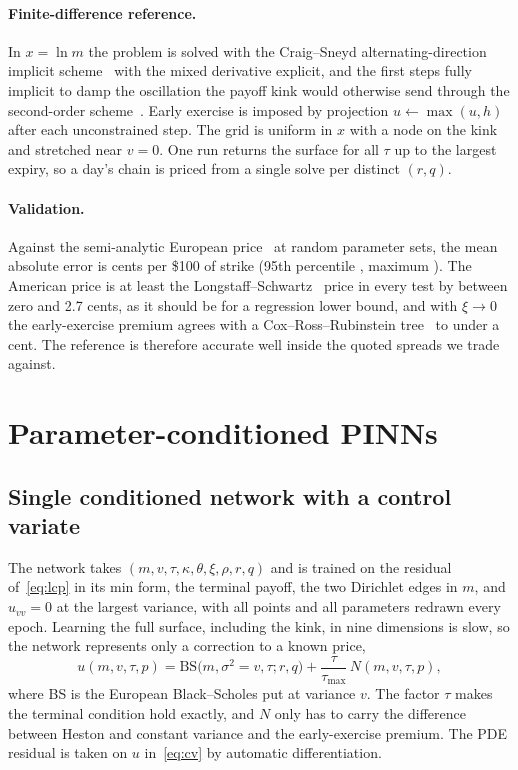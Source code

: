 \documentclass[11pt]{article}
\begin{document}
\paragraph{Finite-difference reference.}
In $x=\ln m$ the problem is solved with the Craig--Sneyd alternating-direction implicit scheme~\cite{craig1988adi,inthout2010adi} with the mixed derivative explicit, and the first steps fully implicit to damp the oscillation the payoff kink would otherwise send through the second-order scheme~\cite{rannacher1984finite}. Early exercise is imposed by projection $u\leftarrow\max(u,h)$ after each unconstrained step. The grid is uniform in $x$ with a node on the kink and stretched near $v=0$. One run returns the surface for all $\tau$ up to the largest expiry, so a day's chain is priced from a single solve per distinct $(r,q)$.

\paragraph{Validation.}
Against the semi-analytic European price~\cite{albrecher2007little} at \fdEuN{} random parameter sets, the mean absolute error is \fdEuMae{} cents per \$100 of strike (95th percentile , maximum \fdEuMax{}). The American price is at least the Longstaff--Schwartz~\cite{longstaff2001valuing} price in every test by between zero and 2.7 cents, as it should be for a regression lower bound, and with $\xi\to0$ the early-exercise premium agrees with a Cox--Ross--Rubinstein tree~\cite{cox1979option} to under a cent. The reference is therefore accurate well inside the quoted spreads we trade against.

\section{Parameter-conditioned PINNs}
\subsection{Single conditioned network with a control variate}
The network takes $(m,v,\tau,\kappa,\theta,\xi,\rho,r,q)$ and is trained on the residual of~\eqref{eq:lcp} in its min form, the terminal payoff, the two Dirichlet edges in $m$, and $u_{vv}=0$ at the largest variance, with all points and all parameters redrawn every epoch. Learning the full surface, including the kink, in nine dimensions is slow, so the network represents only a correction to a known price,
\begin{equation}
u(m,v,\tau,p)=\mathrm{BS}\bigl(m,\sigma^2{=}v,\tau;r,q\bigr)+\frac{\tau}{\tau_{\max}}\,N(m,v,\tau,p),
\label{eq:cv}
\end{equation}
where BS is the European Black--Scholes put at variance $v$. The factor $\tau$ makes the terminal condition hold exactly, and $N$ only has to carry the difference between Heston and constant variance and the early-exercise premium. The PDE residual is taken on $u$ in~\eqref{eq:cv} by automatic differentiation.
\end{document}
